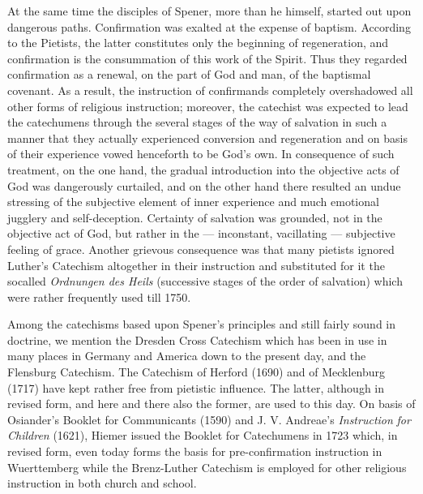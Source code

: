 At the same time the disciples of Spener, more than he himself, started out upon dangerous paths. Confirmation was exalted at the expense of baptism. According to the Pietists, the latter constitutes only the beginning of regeneration, and confirmation is the consummation of this work of the Spirit. Thus they regarded confirmation as a renewal, on the part of God and man, of the baptismal covenant. As a result, the instruction of confirmands completely overshadowed all other forms of religious instruction; moreover, the catechist was expected to lead the catechumens through the several stages of the way of salvation in such a manner that they actually experienced conversion and regeneration and on basis of their experience vowed henceforth to be God's own. In consequence of such treatment, on the one hand, the gradual introduction into the objective acts of God was dangerously curtailed, and on the other hand there resulted an undue stressing of the subjective element of inner experience and much emotional jugglery and self-deception. Certainty of salvation was grounded, not in the objective act of God, but rather in the — inconstant, vacillating — subjective feeling of grace. Another grievous consequence was that many pietists ignored Luther's Catechism altogether in their instruction and substituted for it the socalled \emph{Ordnungen des Heils} (successive stages of the order of salvation) which were rather frequently used till 1750.

Among the catechisms based upon Spener's principles and still fairly sound in doctrine, we mention the Dresden Cross Catechism which has been in use in many places in Germany and America down to the present day, and the Flensburg Catechism. The Catechism of Herford (1690) and of Mecklenburg (1717) have kept rather free from pietistic influence. The latter, although in revised form, and here and there also the former, are used to this day. On basis of Osiander's Booklet for Communicants (1590) and J. V. Andreae's \emph{Instruction}
\emph{for Children} (1621), Hiemer issued the Booklet for Catechumens in 1723 which, in revised form, even today forms the basis for pre-confirmation instruction in Wuerttemberg while the Brenz-Luther Catechism is employed for other religious instruction in both church and school.

